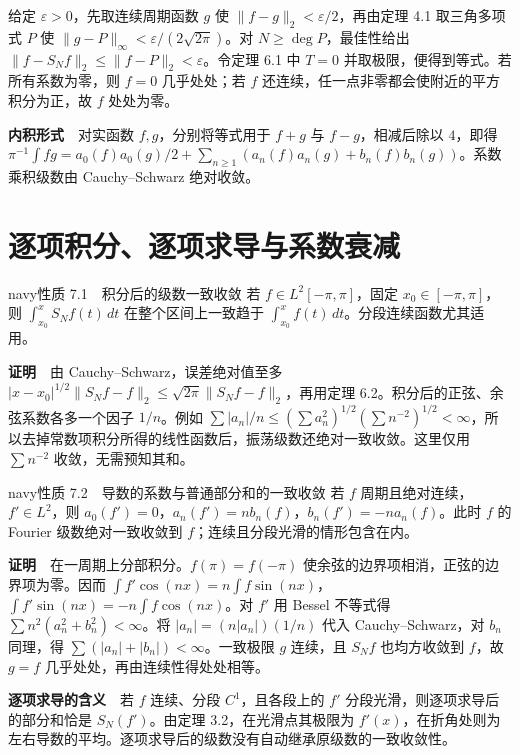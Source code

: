 \documentclass[12pt,a4paper]{article}
\newcommand{\mysection}[1]{\clearpage\section{#1}}
\begin{document}
给定 \(\varepsilon>0\)，先取连续周期函数 \(g\) 使 \(\|f-g\|_2<\varepsilon/2\)，再由定理 4.1 取三角多项式 \(P\) 使 \(\|g-P\|_\infty<\varepsilon/(2\sqrt{2\pi})\)。对 \(N\ge\deg P\)，最佳性给出 \(\|f-S_N f\|_2\le\|f-P\|_2<\varepsilon\)。令定理 6.1 中 \(T=0\) 并取极限，便得到等式。若所有系数为零，则 \(f=0\) 几乎处处；若 \(f\) 还连续，任一点非零都会使附近的平方积分为正，故 \(f\) 处处为零。

\textbf{内积形式}　对实函数 \(f,g\)，分别将等式用于 \(f+g\) 与 \(f-g\)，相减后除以 \(4\)，即得 \(\pi^{-1}\int fg=a_0(f)a_0(g)/2+\sum_{n\ge1}(a_n(f)a_n(g)+b_n(f)b_n(g))\)。系数乘积级数由 Cauchy--Schwarz 绝对收敛。

\mysection{逐项积分、逐项求导与系数衰减}




\begin{sboxenv}{navy}{性质 7.1　积分后的级数一致收敛}
若 \(f\in L^2[-\pi,\pi]\)，固定 \(x_0\in[-\pi,\pi]\)，则 \(\int_{x_0}^x S_Nf(t)\,dt\) 在整个区间上一致趋于 \(\int_{x_0}^x f(t)\,dt\)。分段连续函数尤其适用。
\end{sboxenv}

\textbf{证明}　由 Cauchy--Schwarz，误差绝对值至多 \(|x-x_0|^{1/2}\|S_Nf-f\|_2\le\sqrt{2\pi}\|S_Nf-f\|_2\)，再用定理 6.2。积分后的正弦、余弦系数各多一个因子 \(1/n\)。例如 \(\sum |a_n|/n\le(\sum a_n^2)^{1/2}(\sum n^{-2})^{1/2}<\infty\)，所以去掉常数项积分所得的线性函数后，振荡级数还绝对一致收敛。这里仅用 \(\sum n^{-2}\) 收敛，无需预知其和。

\begin{sboxenv}{navy}{性质 7.2　导数的系数与普通部分和的一致收敛}
若 \(f\) 周期且绝对连续，\(f'\in L^2\)，则 \(a_0(f')=0\)，\(a_n(f')=n b_n(f)\)，\(b_n(f')=-n a_n(f)\)。此时 \(f\) 的 Fourier 级数绝对一致收敛到 \(f\)；连续且分段光滑的情形包含在内。
\end{sboxenv}

\textbf{证明}　在一周期上分部积分。\(f(\pi)=f(-\pi)\) 使余弦的边界项相消，正弦的边界项为零。因而 \(\int f'\cos(nx)=n\int f\sin(nx)\)，\(\int f'\sin(nx)=-n\int f\cos(nx)\)。对 \(f'\) 用 Bessel 不等式得 \(\sum n^2(a_n^2+b_n^2)<\infty\)。将 \(|a_n|=(n|a_n|)(1/n)\) 代入 Cauchy--Schwarz，对 \(b_n\) 同理，得 \(\sum(|a_n|+|b_n|)<\infty\)。一致极限 \(g\) 连续，且 \(S_Nf\) 也均方收敛到 \(f\)，故 \(g=f\) 几乎处处，再由连续性得处处相等。

\textbf{逐项求导的含义}　若 \(f\) 连续、分段 \(C^1\)，且各段上的 \(f'\) 分段光滑，则逐项求导后的部分和恰是 \(S_N(f')\)。由定理 3.2，在光滑点其极限为 \(f'(x)\)，在折角处则为左右导数的平均。逐项求导后的级数没有自动继承原级数的一致收敛性。
\end{document}
